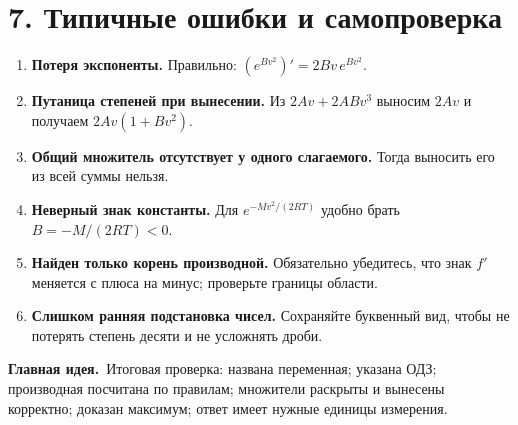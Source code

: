 \documentclass[a4paper,12pt]{article}
\newcommand{\idea}[1]{\par\noindent\textcolor{accentdark}{\textbf{Главная идея.}}\ #1\par}
\begin{document}
\section*{7. Типичные ошибки и самопроверка}
\begin{enumerate}
 \item \textbf{Потеря экспоненты.} Правильно: $(e^{Bv^2})'=2Bv\,e^{Bv^2}$.
 \item \textbf{Путаница степеней при вынесении.} Из $2Av+2ABv^3$ выносим $2Av$ и получаем $2Av(1+Bv^2)$.
 \item \textbf{Общий множитель отсутствует у одного слагаемого.} Тогда выносить его из всей суммы нельзя.
 \item \textbf{Неверный знак константы.} Для $e^{-Mv^2/(2RT)}$ удобно брать $B=-M/(2RT)<0$.
 \item \textbf{Найден только корень производной.} Обязательно убедитесь, что знак $f'$ меняется с плюса на минус; проверьте границы области.
 \item \textbf{Слишком ранняя подстановка чисел.} Сохраняйте буквенный вид, чтобы не потерять степень десяти и не усложнять дроби.
\end{enumerate}
\idea{Итоговая проверка: названа переменная; указана ОДЗ; производная посчитана по правилам; множители раскрыты и вынесены корректно; доказан максимум; ответ имеет нужные единицы измерения.}

\clearpage
\end{document}
